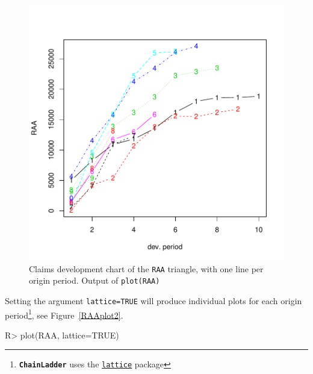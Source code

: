 \documentclass{article}
\newcommand{\chainladder}{\textbf{\texttt{ChainLadder}} }
\begin{document}
\begin{figure}
  \centering
\includegraphics{ChainLadder-TrianglePlot1}
\caption{Claims development chart of the \texttt{RAA} triangle, with
  one line per origin period. Output of \texttt{plot(RAA)}
  }
\label{RAAplot}
\end{figure}

Setting the argument \texttt{lattice=TRUE} will produce individual
plots for each origin period\footnote{\chainladder uses the
  \href{http://cran.r-project.org/package=lattice}{\texttt{lattice}}
  package}, see Figure~\ref{RAAplot2}. 
\begin{Schunk}
\begin{Sinput}
R> plot(RAA, lattice=TRUE)
\end{Sinput}
\end{Schunk}
\end{document}
